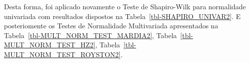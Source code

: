 \documentclass[
  portuguese,
  11pt,
]{article}
\begin{document}
Desta forma, foi aplicado novamente o Teste de Shapiro-Wilk para
normalidade univariada com resultados dispostos na
Tabela~\ref{tbl-SHAPIRO_UNIVAR2}. E posteriomente os Testes de
Normalidade Multivariada apresentados na
Tabela~\ref{tbl-MULT_NORM_TEST_MARDIA2},
Tabela~\ref{tbl-MULT_NORM_TEST_HZ2},
Tabela~\ref{tbl-MULT_NORM_TEST_ROYSTON2}.

\begin{table}

\caption{\label{tbl-SHAPIRO_UNIVAR2}Teste de Shapiro-Wilk para
Normalidade Univariada.}


\end{table}%
\end{document}
